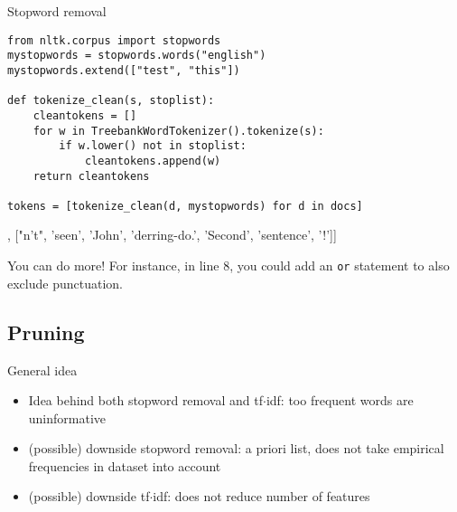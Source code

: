 \documentclass[compress]{beamer}
\begin{document}
\begin{frame}[fragile]{Stopword removal}
\begin{lstlisting}
from nltk.corpus import stopwords
mystopwords = stopwords.words("english")
mystopwords.extend(["test", "this"])

def tokenize_clean(s, stoplist):
    cleantokens = []
    for w in TreebankWordTokenizer().tokenize(s):
        if w.lower() not in stoplist:
            cleantokens.append(w)
    return cleantokens

tokens = [tokenize_clean(d, mystopwords) for d in docs]
\end{lstlisting}
\begin{lstlistingoutputtiny}
[['text'], ["n't", 'seen', 'John', 'derring-do.', 'Second', 'sentence', '!']]
\end{lstlistingoutputtiny}

\begin{alertblock}{You can do more!}
For instance, in line 8, you could add an \texttt{or} statement to also exclude punctuation.
\end{alertblock}

\end{frame}





\subsection{Pruning}

\begin{frame}{General idea}
\begin{itemize}
	\item Idea behind both stopword removal and tf$\cdot$idf: too frequent words are uninformative
	\item<2-> (possible) downside stopword removal: a priori list, does not take empirical frequencies in dataset into account
	\item<3-> (possible) downside tf$\cdot$idf: does not reduce number of features
\end{itemize}

\end{frame}
\end{document}
